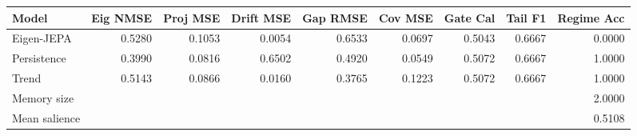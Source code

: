 \begin{tabular}{lrrrrrrrr}
\toprule
Model & Eig NMSE & Proj MSE & Drift MSE & Gap RMSE & Cov MSE & Gate Cal & Tail F1 & Regime Acc \\
\midrule
Eigen-JEPA & 0.5280 & 0.1053 & 0.0054 & 0.6533 & 0.0697 & 0.5043 & 0.6667 & 0.0000 \\
Persistence & 0.3990 & 0.0816 & 0.6502 & 0.4920 & 0.0549 & 0.5072 & 0.6667 & 1.0000 \\
Trend & 0.5143 & 0.0866 & 0.0160 & 0.3765 & 0.1223 & 0.5072 & 0.6667 & 1.0000 \\
\midrule
Memory size & \multicolumn{8}{r}{2.0000} \\
Mean salience & \multicolumn{8}{r}{0.5108} \\
\bottomrule
\end{tabular}